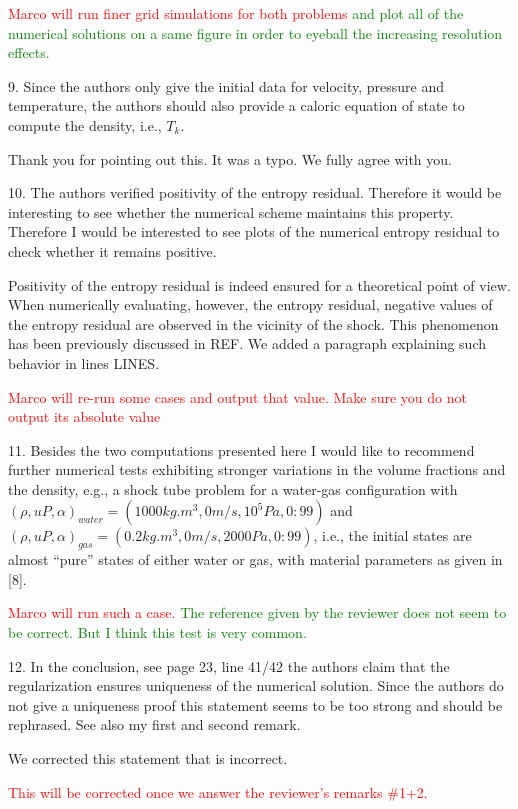 \documentclass{article}
\newcommand{\tcr}[1]{\textcolor{red}{#1}}
\newcommand{\tcg}[1]{\textcolor{green}{#1}}
\begin{document}
\tcr{Marco will run finer grid simulations for both problems} \tcg{ and plot all of the numerical solutions on a same
figure in order to eyeball the increasing resolution effects.}
\bigskip


{\color{blue}
9. Since the authors only give the initial data for velocity, pressure and temperature,
the authors should also provide a caloric equation of state to compute the density,
i.e., $T_k$.}

Thank you for pointing out this. It was a typo. We fully agree with you.
\bigskip


{\color{blue}
10. The authors verified positivity of the entropy residual. Therefore it would be 
interesting to see whether the numerical scheme maintains this property. Therefore I
would be interested to see plots of the numerical entropy residual to check whether
it remains positive.}

Positivity of the entropy residual is indeed ensured for a theoretical point of view. When numerically evaluating, however,
the entropy residual, negative values of the entropy residual are observed in the vicinity of the shock. This phenomenon
has been previously discussed in REF. We added a paragraph explaining such behavior in lines LINES.

\tcr{Marco will re-run some cases and output that value. Make sure you do not output its absolute value}
\bigskip


{\color{blue}
11. Besides the two computations presented here I would like to recommend further
numerical tests exhibiting stronger variations in the volume fractions and the density, 
e.g., a shock tube problem for a water-gas configuration with 
$(\rho, u P, \alpha)_{water} = (1000kg.m^3, 0m/s, 10^5Pa, 0:99)$ and 
$(\rho, u P, \alpha)_{gas}   = (0.2 kg.m^3, 0m/s, 2000Pa, 0:99)$,
i.e., the initial states are almost ``pure'' states of either water or gas, with material
parameters as given in [8].}

\tcr{Marco will run such a case.} \tcg{The reference given by the reviewer does not seem to be correct. But I think
this test is very common.}
\bigskip


{\color{blue}
12. In the conclusion, see page 23, line 41/42 the authors claim that the regularization
ensures uniqueness of the numerical solution. Since the authors do not give a 
uniqueness proof this statement seems to be too strong and should be rephrased. See also
my first and second remark.}

We corrected this statement that is incorrect.

\tcr{This will be corrected once we answer the reviewer's remarks \#1+2.}
\bigskip


{\color{blue}
}

\bigskip


{\color{blue}
}

\bigskip
\end{document}
